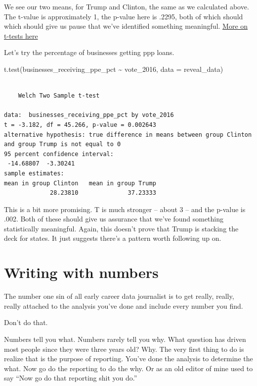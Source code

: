 \documentclass[
  letterpaper,
  DIV=11,
  numbers=noendperiod]{scrreprt}
\newenvironment{Shaded}{\begin{snugshade}}{\end{snugshade}}
\newcommand{\AttributeTok}[1]{\textcolor[rgb]{0.40,0.45,0.13}{#1}}
\newcommand{\FunctionTok}[1]{\textcolor[rgb]{0.28,0.35,0.67}{#1}}
\newcommand{\NormalTok}[1]{\textcolor[rgb]{0.00,0.23,0.31}{#1}}
\newcommand{\SpecialCharTok}[1]{\textcolor[rgb]{0.37,0.37,0.37}{#1}}
\begin{document}
We see our two means, for Trump and Clinton, the same as we calculated
above. The t-value is approximately 1, the p-value here is .2295, both
of which should which should give us pause that we've identified
something meaningful.
\href{https://conjointly.com/kb/statistical-student-t-test/}{More on
t-tests here}

Let's try the percentage of businesses getting ppp loans.

\begin{Shaded}
\begin{Highlighting}[]
\FunctionTok{t.test}\NormalTok{(businesses\_receiving\_ppe\_pct }\SpecialCharTok{\textasciitilde{}}\NormalTok{ vote\_2016, }\AttributeTok{data =}\NormalTok{ reveal\_data)}
\end{Highlighting}
\end{Shaded}

\begin{verbatim}

    Welch Two Sample t-test

data:  businesses_receiving_ppe_pct by vote_2016
t = -3.182, df = 45.266, p-value = 0.002643
alternative hypothesis: true difference in means between group Clinton and group Trump is not equal to 0
95 percent confidence interval:
 -14.68807  -3.30241
sample estimates:
mean in group Clinton   mean in group Trump 
             28.23810              37.23333 
\end{verbatim}

This is a bit more promising. T is much stronger -- about 3 -- and the
p-value is .002. Both of these should give us assurance that we've found
something statistically meaningful. Again, this doesn't prove that Trump
is stacking the deck for states. It just suggests there's a pattern
worth following up on.


\hypertarget{writing-with-numbers}{%
\chapter{Writing with numbers}\label{writing-with-numbers}}

The number one sin of all early career data journalist is to get really,
really, really attached to the analysis you've done and include every
number you find.

Don't do that.

Numbers tell you what. Numbers rarely tell you why. What question has
driven most people since they were three years old? Why. The very first
thing to do is realize that is the purpose of reporting. You've done the
analysis to determine the what. Now go do the reporting to do the why.
Or as an old editor of mine used to say ``Now go do that reporting shit
you do.''
\end{document}

